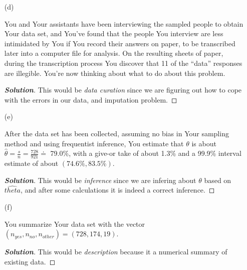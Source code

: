 \documentclass[12pt]{article}
\newenvironment{solution}{\begin{proof}[\textbf{\textit{Solution}}] }{\end{proof}}
\begin{document}
\begin{itemize}
\begin{itemize}
\vspace*{0.6in}

\item[(d)]

You and Your assistants have been interviewing the sampled people to obtain Your data set, and You've found that the people You interview are less intimidated by You if You record their answers on paper, to be transcribed later into a computer file for analysis. On the resulting sheets of paper, during the transcription process You discover that 11 of the ``data'' responses are illegible. You're now thinking about what to do about this problem.

\begin{tcolorbox}
    \begin{solution}
        This would be \textit{data curation} since we are figuring out how to cope with the errors in our data, and imputation problem.  
    \end{solution}
\end{tcolorbox}

\vspace*{0.6in}

\item[(e)]

After the data set has been collected, assuming no bias in Your sampling method and using frequentist inference, You estimate that $\theta$ is about $\hat{ \theta } = \frac{ s }{ n } = \frac{ 728 }{ 921 } \doteq$ 79.0\%, with a give-or take of about 1.3\% and a 99.9\% interval estimate of about $( 74.6\%, 83.5\% )$.

\begin{tcolorbox}
    \begin{solution}
        This would be \textit{inference} since we are infering about $\theta$ based on $\hat{theta}$, and after some calculations it is indeed a correct inference. 
    \end{solution}
\end{tcolorbox}

\vspace*{0.6in}

\item[(f)]

You summarize Your data set with the vector $( n_{ yes }, n_{ no }, n_{ other } ) = ( 728, 174, 19 )$.
\begin{tcolorbox}
    \begin{solution}
        This would be \textit{description} because it a numerical summary of existing data. 
    \end{solution}
\end{tcolorbox}
\vspace*{0.6in}


\end{itemize}
\end{itemize}
\end{document}
